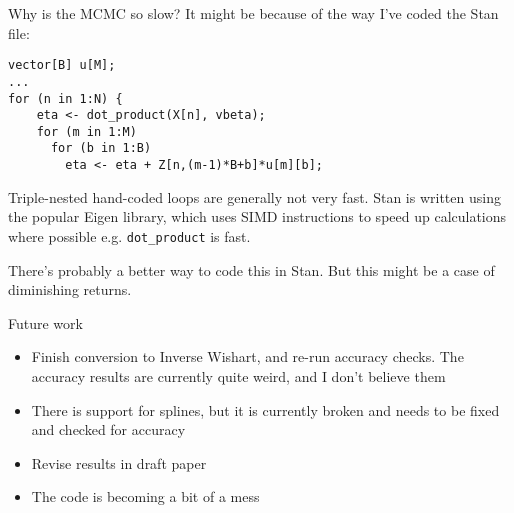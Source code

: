 \documentclass{beamer}
\begin{document}
\begin{frame}[fragile]{Why is the MCMC so slow?}
It might be because of the way I've coded the Stan file:
\begin{verbatim}
vector[B] u[M];
...
for (n in 1:N) {    
    eta <- dot_product(X[n], vbeta);
    for (m in 1:M)
      for (b in 1:B)
        eta <- eta + Z[n,(m-1)*B+b]*u[m][b];
\end{verbatim}

Triple-nested hand-coded loops are generally not very fast. Stan is written using
the popular Eigen library, which uses SIMD instructions to speed up calculations where 
possible e.g. \texttt{dot\_product} is fast.

There's probably a better way to code this in Stan. But this might be a case of 
diminishing returns.

\end{frame}

\begin{frame}{Future work}
\begin{itemize}
\item Finish conversion to Inverse Wishart, and re-run accuracy checks. The accuracy
results are currently quite weird, and I don't believe them
\item There is support for splines, but it is currently broken and needs to be fixed
and checked for accuracy
\item Revise results in draft paper
\item The code is becoming a bit of a mess
\end{itemize}
\end{frame}
\end{document}
